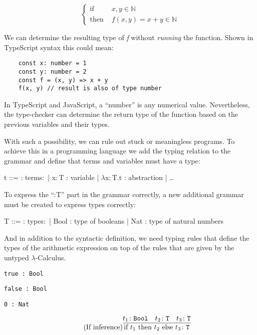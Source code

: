 \begin{equation*}
    \begin{cases}
        \text{if }   & x,y \in \mathbb{N}            \\
        \text{then } & f(x,y) = x + y \in \mathbb{N}
    \end{cases}
\end{equation*}

We can determine the resulting type of \textit{f} without
\textit{running} the function. Shown in TypeScript syntax this could mean:

\begin{verbatim}
    const x: number = 1
    const y: number = 2
    const f = (x, y) => x + y
    f(x, y) // result is also of type number
\end{verbatim}

In TypeScript and JavaScript, a ``number'' is any numerical
value. Nevertheless, the type-checker can determine the return type
of the function based on the previous variables and their types.

With such a possibility, we can rule out stuck or meaningless programs.
To achieve this in a programming language we add the typing relation to
the grammar and define that terms and variables must have a type:

\begin{bnfgrammar}
    t ::= : terms$\colon$
    | x$\colon$T : variable
    | $\lambda$x$\colon$T.t : abstraction
    | \dots
\end{bnfgrammar}

To express the ``:T'' part in the grammar correctly, a new additional
grammar must be created to express types correctly:

\begin{bnfgrammar}
    T ::= : types$\colon$
    | Bool : type of booleans
    | Nat : type of natural numbers
\end{bnfgrammar}

And in addition to the syntactic definition, we need typing rules
that define the types of the arithmetic expression on top of
the rules that are given by the untyped $\lambda$-Calculus.

\begin{center}
    \texttt{true : Bool}
    
    \texttt{false : Bool}
    
    \texttt{0 : Nat}
\end{center}

\begin{equation*}
    \label{eq:BoolInference}
    \tag{If inference}
    \infer{
        \text{if } t_1 \text{ then } t_2 \text{ else } t_3 \colon \texttt{T}
    }{
        t_1 \colon \texttt{Bool} & t_2 \colon \texttt{T} & t_3 \colon \texttt{T}
    }
\end{equation*}


